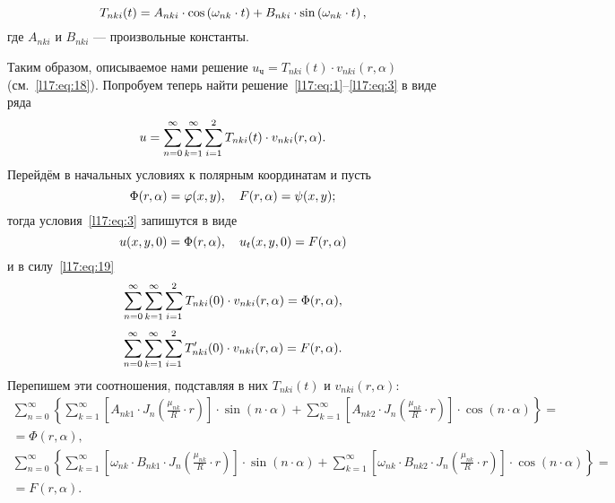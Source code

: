 \begin{equation*}
	\hfill T_{nki}(t)=A_{nki}\cdot\cos\left(\omega_{nk}\cdot t\right)+B_{nki}\cdot\sin\left(\omega_{nk}\cdot t\right),\hfill
\end{equation*}
где $A_{nki}$ и $B_{nki}$ --- произвольные константы. 

 Таким образом, описываемое нами решение $u_{\text{ч}}=T_{nki}(t)\cdot v_{nki}(r,\alpha)$ (см.~\eqref{l17:eq:18}). Попробуем теперь найти решение~\eqref{l17:eq:1}--\eqref{l17:eq:3} в виде ряда 
\begin{equation}\label{l17:eq:19}
	\hfill u=\sum\limits_{n=0}^{\infty}\sum\limits_{k=1}^{\infty}\sum\limits_{i=1}^{2}T_{nki}(t)\cdot v_{nki}(r,\alpha).\hfill
\end{equation}
Перейдём в начальных условиях к полярным координатам и пусть
\begin{equation*}
	\hfill\Phi(r,\alpha)=\phi(x,y),\quad F(r,\alpha)=\psi(x,y);\hfill
\end{equation*}
тогда условия~\eqref{l17:eq:3} запишутся в виде
\begin{equation*}
	\hfill u(x,y,0)=\Phi(r,\alpha),\quad u_t(x,y,0)=F(r,\alpha)\hfill
\end{equation*}
и в силу~\eqref{l17:eq:19}
\begin{equation}\label{l17:eq:20}
	\hfill\sum\limits_{n=0}^{\infty}\sum\limits_{k=1}^{\infty}\sum\limits_{i=1}^{2}T_{nki}(0)\cdot v_{nki}(r,\alpha)=\Phi(r,\alpha),\hfill
\end{equation}
\begin{equation}\label{l17:eq:21}
	\hfill\sum\limits_{n=0}^{\infty}\sum\limits_{k=1}^{\infty}\sum\limits_{i=1}^{2}T'_{nki}(0)\cdot v_{nki}(r,\alpha)=F(r,\alpha).\hfill
\end{equation}
Перепишем эти соотношения,  подставляя в них   $T_{nki}(t)$ и $v_{nki}(r,\alpha)$:
\begin{multline}\label{l17:eq:22}
	\sum\limits_{n=0}^{\infty}\left\{\sum\limits_{k=1}^{\infty}\left[A_{nk1}\cdot J_n\left(\frac{\mu_{nk}}{R}\cdot r\right)\right]\cdot\sin\left(n\cdot\alpha\right)+\sum\limits_{k=1}^{\infty}\left[A_{nk2}\cdot J_n\left(\frac{\mu_{nk}}{R}\cdot r\right)\right]\cdot\cos\left(n\cdot\alpha\right) \right\}=\\=\Phi(r,\alpha),
\end{multline}
\begin{multline}\label{l17:eq:23}
	\sum\limits_{n=0}^{\infty}\left\{\sum\limits_{k=1}^{\infty}\left[\omega_{nk}\cdot B_{nk1}\cdot J_n\left(\frac{\mu_{nk}}{R}\cdot r\right)\right]\cdot\sin\left(n\cdot\alpha\right)+\sum\limits_{k=1}^{\infty}\left[\omega_{nk}\cdot B_{nk2}\cdot J_n\left(\frac{\mu_{nk}}{R}\cdot r\right)\right]\cdot\cos\left(n\cdot\alpha\right) \right\}=\\=F(r,\alpha).
\end{multline}
